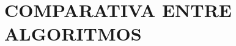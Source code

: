 \documentclass[../main.tex]{subfiles}
\begin{document}
	\chapter{COMPARATIVA ENTRE ALGORITMOS}
\end{document}
